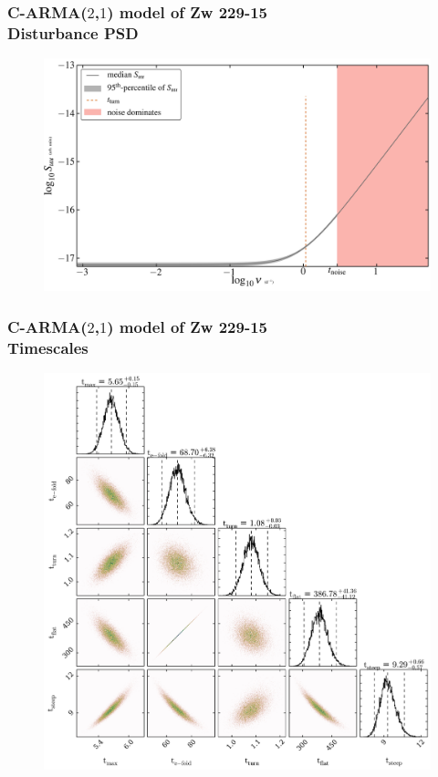 \documentclass[hyperref={pdfpagelabels=false}]{beamer}
\begin{document}
\begin{frame}
\frametitle{C-ARMA($2$,$1$) model of Zw 229-15\\Disturbance PSD}
  \begin{figure}
    \includegraphics[scale=0.065]{images/Zw229-15_distPSD.jpg}
  \end{figure}
\end{frame}

\begin{frame}
\frametitle{C-ARMA($2$,$1$) model of Zw 229-15\\Timescales}
  \begin{figure}
    \includegraphics[scale=0.055]{images/Zw229-15_Times.jpg}
  \end{figure}
\end{frame}
\end{document}
